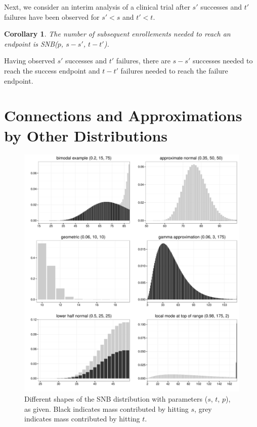 \documentclass[review]{elsarticle}
\newtheorem{corollary}{Corollary}
\begin{document}
Next, we consider an interim analysis of a clinical trial after $s'$ 
successes and $t'$ failures have been observed for $s' < s$ and $t' < t$.
\begin{corollary} \label{conditional_distribution}
The number of subsequent enrollements needed 
to reach an endpoint is SNB($p$, $s-s'$, $t-t'$).
\end{corollary}
Having observed $s'$
successes and $t'$ failures, there are $s-s'$ successes needed to reach the
success endpoint and $t-t'$ failures needed to reach the failure endpoint.

\section{Connections and Approximations by Other Distributions}

\begin{figure}[p!]
\begin{center}
\includegraphics[width=\textwidth]{shapes.pdf}
\end{center}
\caption{Different shapes of the SNB distribution with parameters ($s$, $t$, $p$), as given. Black indicates mass contributed by hitting $s$, grey indicates
mass contributed by hitting $t$. \label{shapes.fig}}
\end{figure}
\end{document}
